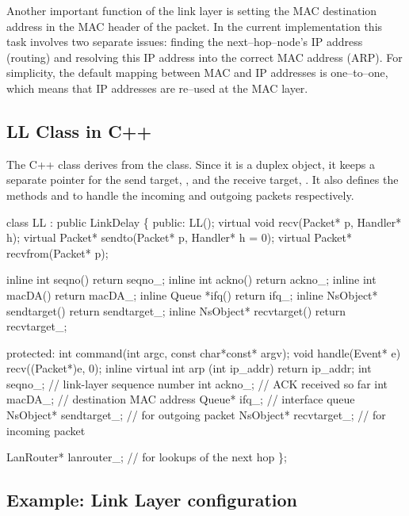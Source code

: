 Another important function of the link layer is setting the MAC
destination address in the MAC header of the packet.  In the current
implementation this task involves two separate issues: finding the
next--hop--node's IP address (routing) and resolving this IP address
into the correct MAC address (ARP).  For simplicity, the default
mapping between MAC and IP addresses is one--to--one, which means that
IP addresses are re--used at the MAC layer.

\subsection{LL Class in C++}
\label{sec:llcplus}

The C++ class  derives from the  class.  Since
it is a duplex object, it keeps a separate pointer for the send target,
, and the receive target, .  It also
defines the methods  and  to handle the
incoming and outgoing packets respectively.

\begin{program}
   class LL : public LinkDelay \{
   public:
   	   LL();
   	   virtual void recv(Packet* p, Handler* h);
   	   virtual Packet* sendto(Packet* p, Handler* h = 0);
   	   virtual Packet* recvfrom(Packet* p);
   
   	   inline int seqno() { return seqno_; }
   	   inline int ackno() { return ackno_; }
   	   inline int macDA() { return macDA_; }
   	   inline Queue *ifq() { return ifq_; }
   	   inline NsObject* sendtarget() { return sendtarget_; }
   	   inline NsObject* recvtarget() { return recvtarget_; }
   
   protected:
   	   int command(int argc, const char*const* argv);
   	   void handle(Event* e) { recv((Packet*)e, 0); }
   	   inline virtual int arp (int ip_addr) { return ip_addr; } 
   	   int seqno_;			// link-layer sequence number
   	   int ackno_;			// ACK received so far
   	   int macDA_;			// destination MAC address
   	   Queue* ifq_;			// interface queue
   	   NsObject* sendtarget_;		// for outgoing packet 
   	   NsObject* recvtarget_;		// for incoming packet
   
   	   LanRouter* lanrouter_; // for lookups of the next hop
   \};
\end{program}

\subsection{Example: Link Layer configuration}
\label{ex:linklayer}

